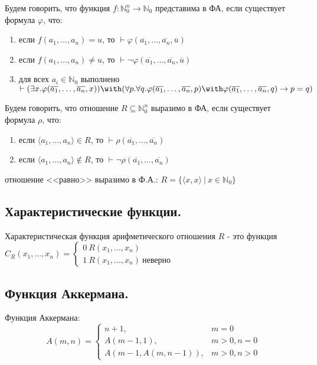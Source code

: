 \documentclass[10pt,a4paper,oneside]{article}
\begin{document}
Будем говорить, что функция $f: \mathbb{N}^n_0\to\mathbb{N}_0$ представима в ФА, 
если существует формула $\varphi$, что:
\begin{enumerate}
\item если $f(a_1,\dots,a_n) = u$, то $\vdash \varphi(\overline{a_1},\dots,\overline{a_n},\overline{u})$
\item если $f(a_1,\dots,a_n) \ne u$, то $\vdash \neg\varphi(\overline{a_1},\dots,\overline{a_n},\overline{u})$
\item для всех $a_i \in \mathbb{N}_0$ выполнено $\vdash (\exists x.\varphi(\overline{a_1},\dots,\overline{a_n},x)) \with 
   (\forall p.\forall q.\varphi(\overline{a_1},\dots,\overline{a_n},p)\with \varphi(\overline{a_1},\dots,\overline{a_n},q)\rightarrow p=q)$
\end{enumerate}

Будем говорить, что отношение $R\subseteq \mathbb{N}^n_0$ выразимо в ФА, 
если существует формула $\rho$, что:
\begin{enumerate}
\item если $\langle a_1,\dots,a_n \rangle \in R$, то $\vdash \rho(\overline{a_1},\dots,\overline{a_n})$
\item если $\langle a_1,\dots,a_n \rangle \notin R$, то $\vdash \neg\rho(\overline{a_1},\dots,\overline{a_n})$
\end{enumerate}


  отношение <<равно>> выразимо в Ф.А.:
$R = \{ \langle x,x \rangle\ |\ x \in \mathbb{N}_0 \}$

\subsection{Характеристические функции.}
Характеристическая функция арифметического отношения $R$ - это функция $C_R(x_1,...,x_n) = \begin{cases}0 \  R(x_1,...,x_n) \\ 1 \  R(x_1,...,x_n) \  \text{неверно} \end{cases}$

\subsection{Функция Аккермана.}
Функция Аккермана:
$$A(m,n) = \left\{\begin{array}{ll}
  n+1,&m = 0\\
  A(m-1,1),&m > 0, n = 0\\
  A(m-1,A(m,n-1)),&m > 0, n > 0
\end{array}\right.$$
\end{document}
